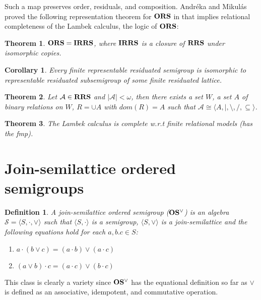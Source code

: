 \documentclass[a4paper]{article}
\theoremstyle{defin}
\newtheorem{defin}{Definition}
\theoremstyle{theorem}
\newtheorem{theorem}{Theorem}
\theoremstyle{prop}
\theoremstyle{lemma}
\theoremstyle{ex}
\theoremstyle{col}
\newtheorem{col}{Corollary}
\begin{document}
Such a map preserves order, residuals, and composition. Andr\'{e}ka and Mikul\'{a}s proved the following representation theorem for ${\bf ORS}$ in \cite{andreka1994lambek} that implies relational completeness of the Lambek calculus, the logic of ${\bf ORS}$:

\begin{theorem}\label{ors=irrs}
  ${\bf ORS} = {\bf IRRS}$, where ${\bf IRRS}$ is a closure of ${\bf RRS}$ under isomorphic copies.
\end{theorem}

\begin{col}
  Every finite representable residuated semigroup is isomorphic to representable residuated subsemigroup of some finite residuated lattice.
\end{col}

\begin{theorem}
  Let $\mathcal{A} \in {\bf RRS}$ and $|\mathcal{A}| < \omega$, then there exists a set $W$, a set $A$ of binary relations on $W$, $R = \cup A$ with $dom(R) = A$ such that
  $\mathcal{A} \cong \langle A, |, \setminus, /, \subseteq \rangle$.
\end{theorem}

\begin{theorem}
  The Lambek calculus is complete w.r.t finite relational models (has the fmp).
\end{theorem}


\section{Join-semilattice ordered semigroups}

\begin{defin} A join-semilattice ordered semigroup (${\bf OS^{\vee}}$) is an algebra $\mathcal{S} = \langle S, \cdot, \vee \rangle$ such that $\langle S, \cdot \rangle$ is a semigroup, $\langle S, \vee \rangle$ is a join-semilattice and the following equations hold for each $a, b. c \in S$:

  \begin{enumerate}
    \item $a \cdot (b \vee c) = (a \cdot b) \vee (a \cdot c)$
    \item $(a \vee b) \cdot c = (a \cdot c) \vee (b \cdot c)$
  \end{enumerate}
\end{defin}
This class is clearly a variety since ${\bf OS^{\vee}}$ has the equational definition so far as $\vee$ is defined as an associative, idempotent, and commutative operation.
\end{document}
